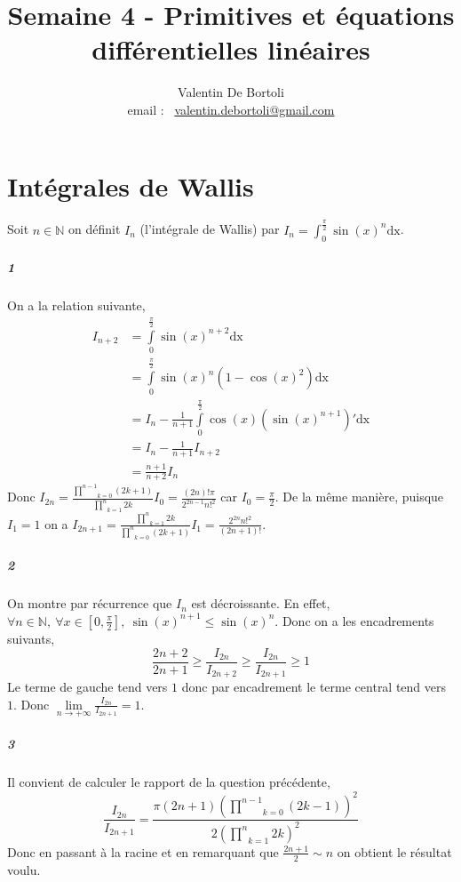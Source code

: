\documentclass[10pt,a4paper]{article}
\title{Semaine 4 - Primitives et équations différentielles linéaires}
\author{Valentin De Bortoli \\ email : \ \href{mailto:valentin.debortoli@gmail.com}{valentin.debortoli@gmail.com}}
\date{}
\begin{document}
\maketitle

\section{Intégrales de Wallis}
Soit $n \in \mathbb{N}$ on définit $I_n$ (l'intégrale de Wallis) par $I_n=\int_0^{\frac{\pi}{2}} \sin(x)^n \text{dx}$.
\subparagraph{1} 
On a la relation suivante,
\begin{equation}
\begin{aligned}
I_{n+2} &= \underset{0}{\overset{\frac{\pi}{2}}{\int}} \sin(x)^{n+2} \text{dx} \\
&= \underset{0}{\overset{\frac{\pi}{2}}{\int}} \sin(x)^n (1- \cos(x)^2) \text{dx} \\
&= I_n - \frac{1}{n+1} \underset{0}{\overset{\frac{\pi}{2}}{\int}} \cos(x) \left(\sin(x)^{n+1} \right)' \text{dx} \\
&= I_n - \frac{1}{n+1}I_{n+2} \\
&=\frac{n+1}{n+2}I_n
\end{aligned}
\end{equation}
Donc ${I_{2n} = \frac{\underset{k=0}{\overset{n-1}{\prod}}(2k+1)}{\underset{k=1}{\overset{n}{\prod}}2k}I_0 = \frac{(2n)!\pi}{2^{2n-1}n!^2}}$ car $I_0 = \frac{\pi}{2}$. De la même manière, puisque $I_1 = 1$ on a ${I_{2n+1} = \frac{\underset{k=1}{\overset{n}{\prod}}2k}{\underset{k=0}{\overset{n}{\prod}}(2k+1)}I_1 = \frac{2^{2n} n!^2}{(2n+1)!}}$.

\subparagraph{2} On montre par récurrence que $I_n$ est décroissante. En effet, $\forall n \in \mathbb{N}, \ \forall x \in [0, \frac{\pi}{2}], \ \sin(x)^{n+1} \le \sin(x)^n$. Donc on a les encadrements suivants,
\begin{equation}
\frac{2n+2}{2n+1} \ge \frac{I_{2n}}{I_{2n+2}} \ge \frac{I_{2n}}{I_{2n+1}} \ge 1
\end{equation}
Le terme de gauche tend vers $1$ donc par encadrement le terme central tend vers $1$. Donc $\underset{n \rightarrow +\infty}{\lim}\frac{I_{2n}}{I_{2n+1}}=1$.

\subparagraph{3}Il convient de calculer le rapport de la question précédente,
\begin{equation}
\frac{I_{2n}}{I_{2n+1}} = \frac{\pi(2n+1) \left( \underset{k=0}{\overset{n-1}{\prod}}(2k-1) \right)^2}{2\left(\underset{k=1}{\overset{n}{\prod}}2k \right)^2}
\end{equation}
Donc en passant à la racine et en remarquant que $\frac{2n+1}{2} \sim n$ on obtient le résultat voulu.
\end{document}

